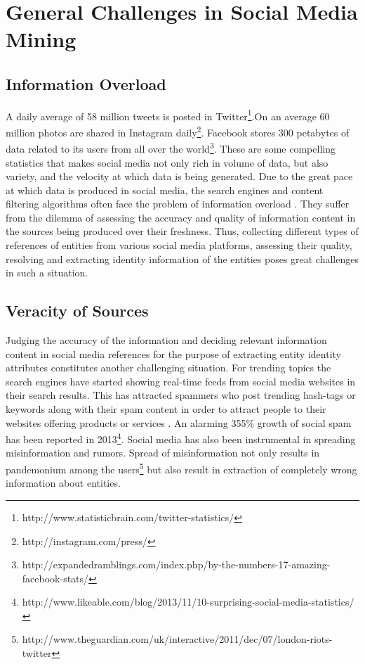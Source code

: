 \section{General Challenges in Social Media Mining}
\subsection{Information Overload}
A daily average of 58 million tweets is posted in Twitter\footnote{http://www.statisticbrain.com/twitter-statistics/}.On an average 60 million  photos are shared in Instagram daily\footnote{http://instagram.com/press/}. Facebook stores 300 petabytes  of data related to its users from all over the world\footnote{http://expandedramblings.com/index.php/by-the-numbers-17-amazing-facebook-stats/}. These are some compelling statistics that makes social media not only rich in volume of data, but also variety, and the velocity at which data is being generated. Due to the great pace at which data is produced in social media, the search engines and content filtering algorithms often face the problem of information overload \cite{hemp2009death}. They suffer from the dilemma of assessing the accuracy and quality of information content in the sources being produced over their freshness. Thus, collecting different types of references of entities from various social media platforms, assessing their quality, resolving and extracting identity information of the entities poses great challenges in such a situation.

\subsection{Veracity of Sources}
Judging the accuracy of the information and deciding relevant information content in social media references for the purpose of extracting entity identity attributes constitutes another challenging situation. For trending topics the search engines have started showing real-time feeds from social media websites in their search results. This has attracted spammers who post trending hash-tags or keywords along with their spam content in order to attract people to their websites offering products or services \cite{benevenuto2010detecting}. An alarming 355\% growth of social spam has been reported in 2013\footnote{http://www.likeable.com/blog/2013/11/10-surprising-social-media-statistics/}. Social media has also been instrumental in spreading misinformation and rumors. Spread of misinformation not only results in pandemonium among the users\footnote{http://www.theguardian.com/uk/interactive/2011/dec/07/london-riots-twitter}  but also result in extraction of completely wrong information about entities.

